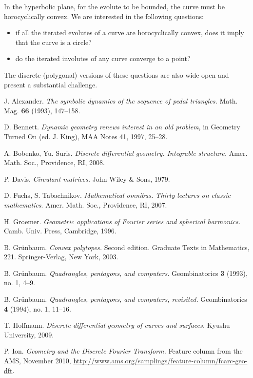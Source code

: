 \documentclass[12pt]{article}
\begin{document}
In the hyperbolic plane, for the evolute to be bounded, the curve must be horocyclically convex. We are interested in the following questions:
\begin{itemize}
\item  if all the iterated evolutes of a curve are  horocyclically convex, does it imply that the curve is a circle?
\item do the iterated involutes of any curve converge to a point?
\end{itemize}

The discrete (polygonal) versions of these questions are also wide open and present a substantial challenge.

\begin{thebibliography}{99}

 J. Alexander. {\it  The symbolic dynamics of the sequence of pedal triangles.} Math. Mag. {\bf 66} (1993),  147--158. 

 D. Bennett. {\it Dynamic geometry renews interest in an old problem}, in Geometry Turned On (ed. J. King), MAA Notes 41, 1997,  25--28.

 A. Bobenko, Yu. Suris.
{\it Discrete differential geometry.  Integrable structure.} Amer. Math. Soc., Providence, RI, 2008.

 P. Davis. {\it Circulant matrices.} John Wiley \& Sons, 1979.

 D. Fuchs, S. Tabachnikov. {\it Mathematical omnibus. Thirty lectures on classic mathematics}. Amer. Math. Soc., Providence, RI, 2007. 

 H. Groemer. {\it Geometric applications of Fourier series and spherical harmonics.}
Camb. Univ. Press, Cambridge, 1996.

 B. Gr\"unbaum. {\it Convex polytopes.} Second edition. Graduate Texts in Mathematics, 221. Springer-Verlag, New York, 2003.

 B. Gr\"unbaum. {\it Quadrangles, pentagons, and computers.} Geombinatorics {\bf 3} (1993), no. 1, 4--9. 

 B. Gr\"unbaum. {\it Quadrangles, pentagons, and computers, revisited.} Geombinatorics {\bf 4} (1994), no. 1, 11--16.

 T. Hoffmann. {\it Discrete differential geometry of curves and surfaces.} Kyushu University, 2009.

 P. Ion. {\it Geometry and the Discrete Fourier Transform.} Feature column from the AMS, November 2010,
\url{http://www.ams.org/samplings/feature-column/fcarc-geo-dft}.


\end{thebibliography}
\end{document}
